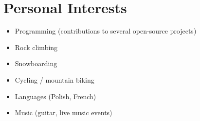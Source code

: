 \documentclass{cv}
\begin{document}

\section{Personal Interests}

\begin{itemize}
\item Programming (contributions to several open-source projects)
\item Rock climbing
\item Snowboarding
\item Cycling / mountain biking
\item Languages (Polish, French)
\item Music (guitar, live music events)
\end{itemize}
\end{document}

